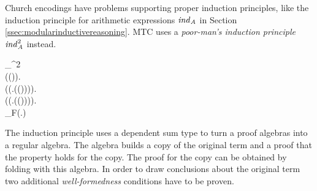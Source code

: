 Church encodings have problems supporting proper induction principles,
like the induction principle for arithmetic expressions \ensuremath{\Varid{ind}_{\Conid{A}}} in
Section \ref{ssec:modularinductivereasoning}. MTC uses a
\emph{poor-man's induction principle} \ensuremath{\Varid{ind}_{\Conid{A}}^2} instead.
\begin{hscode}\SaveRestoreHook
{}%
%
%
%
%
\>[3]{}_{}^2\mathbin{::}{}\<[E]%
\\
\>[3]{}\<[5]%
\>[5]{}\forall (\<[18]%
\>[18]{}\mathbin{::}(\to {})).{}\<[E]%
\\
\>[3]{}\<[5]%
\>[5]{}\forall (\<[18]%
\>[18]{}\mathbin{::}(\forall {}\hsforall .\;(\;(\;)))).{}\<[E]%
\\
\>[3]{}\<[5]%
\>[5]{}\forall (\<[18]%
\>[18]{}\mathbin{::}(\forall {}\hsforall \;.\;\to {}\;\to {}\;(\;(\;\;)))).{}\<[E]%
\\
\>[3]{}\<[5]%
\>[5]{}\;_F\;(\exists {}\hsexists .\;)\hsforall \hsforall \hsforall {}\<[E]%
\ColumnHook
\end{hscode}\resethooks
The induction principle uses a dependent sum type to turn a proof
algebras into a regular algebra. The algebra builds a copy of the
original term and a proof that the property holds for the copy. The
proof for the copy can be obtained by folding with this algebra. In
order to draw conclusions about the original term two additional
\emph{well-formedness} conditions have to be proven.
